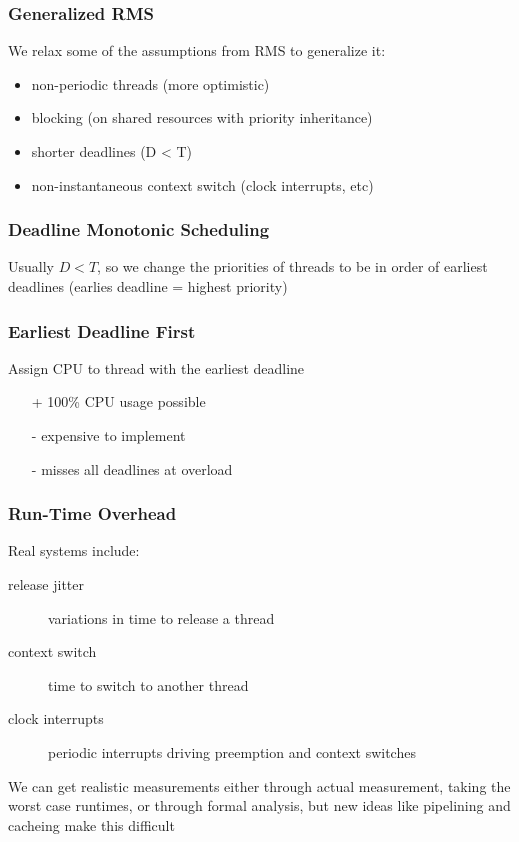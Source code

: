 \documentclass[]{article}
\theoremstyle{definition}
\begin{document}
	\subsubsection{Generalized RMS}
	We relax some of the assumptions from RMS to generalize it:
	\begin{itemize}
		\item non-periodic threads (more optimistic)
		\item blocking (on shared resources with priority inheritance)
		\item shorter deadlines (D < T)
		\item non-instantaneous context switch (clock interrupts, etc)
	\end{itemize}

	\subsubsection{Deadline Monotonic Scheduling}
	Usually $D < T$, so we change the priorities of threads to be in order of earliest deadlines (earlies deadline = highest priority)

	

	\subsubsection{Earliest Deadline First}
	Assign CPU to thread with the earliest deadline
	\begin{itemize}
		\item[+] 100\% CPU usage possible
		\item[-] expensive to implement
		\item[-] misses all deadlines at overload
	\end{itemize}

	\subsubsection{Run-Time Overhead}
	Real systems include:
	\begin{description}
		\item[release jitter] variations in time to release a thread
		\item[context switch] time to switch to another thread
		\item[clock interrupts] periodic interrupts driving preemption and context switches
	\end{description}

	We can get realistic measurements either through actual measurement, taking the worst case runtimes, or through formal analysis, but new ideas like pipelining and cacheing make this difficult
\end{document}
